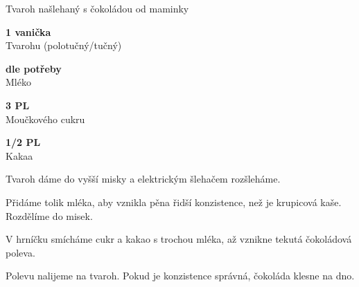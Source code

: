 \documentclass[11pt,a4paper]{article}
\begin{document}
\begin{recipe}[Chocolate]{Tvaroh našlehaný s čokoládou od maminky}
    \begin{ingredients}
        \item \parbox[t]{\linewidth}{\raggedright \piece \textbf{1 vanička}\\ Tvarohu (polotučný/tučný)}
        \item \parbox[t]{\linewidth}{\raggedright \liquid \textbf{dle potřeby}\\ Mléko}
        \item \parbox[t]{\linewidth}{\raggedright \spoon \textbf{3 PL}\\ Moučkového cukru}
        \item \parbox[t]{\linewidth}{\raggedright \spoon \textbf{1/2 PL}\\ Kakaa}
    \end{ingredients}
    \begin{steps}
        \item Tvaroh dáme do vyšší misky a elektrickým šlehačem rozšleháme.
        \item Přidáme tolik mléka, aby vznikla pěna řidší konzistence, než je krupicová kaše. Rozdělíme do misek.
        \item V hrníčku smícháme cukr a kakao s trochou mléka, až vznikne tekutá čokoládová poleva.
        \item Polevu nalijeme na tvaroh. Pokud je konzistence správná, čokoláda klesne na dno.
    \end{steps}
\end{recipe}
\end{document}
